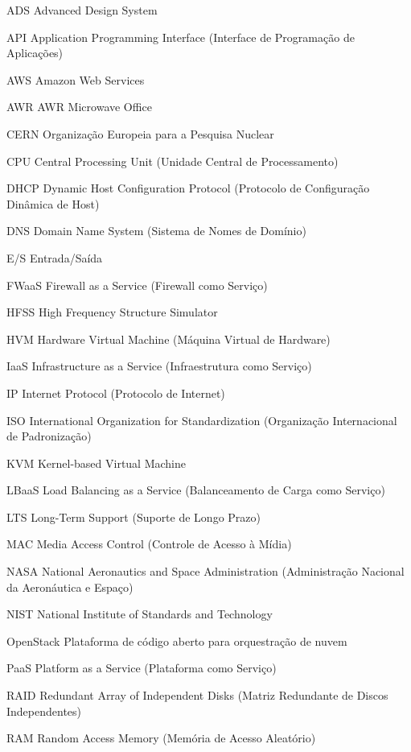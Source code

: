 \begin{siglas}
  \item[ADS] Advanced Design System
  \item[API] Application Programming Interface (Interface de Programação de Aplicações)
  \item[AWS] Amazon Web Services
  \item[AWR] AWR Microwave Office
  \item[CERN] Organização Europeia para a Pesquisa Nuclear
  \item[CPU] Central Processing Unit (Unidade Central de Processamento)
  \item[DHCP] Dynamic Host Configuration Protocol (Protocolo de Configuração Dinâmica de Host)
  \item[DNS] Domain Name System (Sistema de Nomes de Domínio)
  \item[E/S] Entrada/Saída
  \item[FWaaS] Firewall as a Service (Firewall como Serviço)
  \item[HFSS] High Frequency Structure Simulator
  \item[HVM] Hardware Virtual Machine (Máquina Virtual de Hardware)
  \item[IaaS] Infrastructure as a Service (Infraestrutura como Serviço)
  \item[IP] Internet Protocol (Protocolo de Internet)
  \item[ISO] International Organization for Standardization (Organização Internacional de Padronização)
  \item[KVM] Kernel-based Virtual Machine
  \item[LBaaS] Load Balancing as a Service (Balanceamento de Carga como Serviço)
  \item[LTS] Long-Term Support (Suporte de Longo Prazo)
  \item[MAC] Media Access Control (Controle de Acesso à Mídia)
  \item[NASA] National Aeronautics and Space Administration (Administração Nacional da Aeronáutica e Espaço)
  \item[NIST] National Institute of Standards and Technology
  \item[OpenStack] Plataforma de código aberto para orquestração de nuvem
  \item[PaaS] Platform as a Service (Plataforma como Serviço)
  \item[RAID] Redundant Array of Independent Disks (Matriz Redundante de Discos Independentes)
  \item[RAM] Random Access Memory (Memória de Acesso Aleatório)

\end{siglas}
